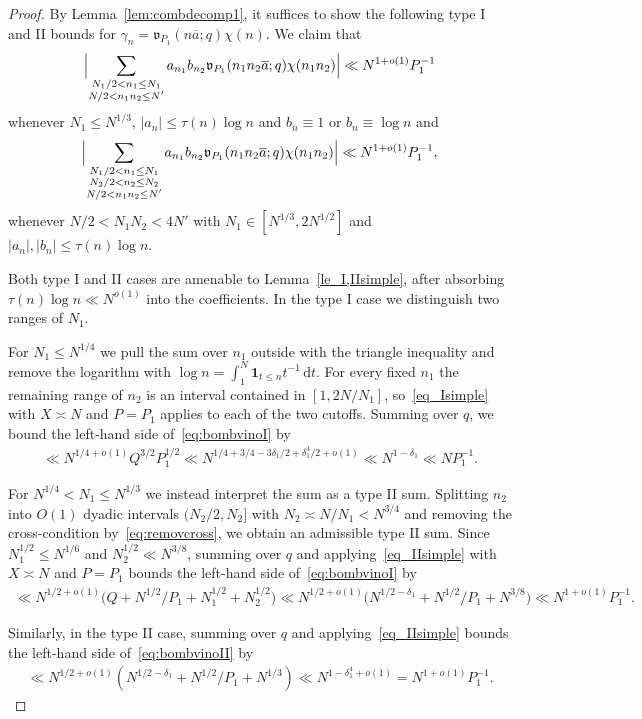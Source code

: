 \documentclass[12pt]{amsart}
\theoremstyle{definition}
\theoremstyle{remark}
\numberwithin{equation}{section}
\newcommand{\1}{\mathbf{1}}
\renewcommand\d{\,\mathrm{d}}
\begin{document}
\begin{proof}

 By Lemma~\ref{lem:combdecomp1}, it suffices to show the following type I and II bounds for $\gamma_n=\mathfrak{v}_{P_1}(n\overline{a};q)\chi(n)$. We claim that
 \begin{align}\label{eq:bombvinoI}
    \Bigl|\sum_{\substack{N_1/2 < n_1 \leq N_1\\ N/2 < n_1 n_2\leq N'}} a_{n_1} b_{n_2} \mathfrak{v}_{P_1}(n_1n_2\overline{a};q)\chi(n_1 n_2)\Bigr|\ll N^{1+o(1)} P_1^{-1}
\end{align}
 whenever $N_1\leq N^{1/3}$, $|a_n|\leq \tau(n)\log n$ and $b_n\equiv 1$ or $b_n\equiv \log n$ and
 \begin{align}\label{eq:bombvinoII}
    \Bigl|\sum_{\substack{N_1/2 < n_1 \leq N_1\\ N_2/2 <  n_2 \leq N_2\\ N/2<n_1n_2\le N'}} a_{n_1} b_{n_2}  \mathfrak{v}_{P_1}(n_1n_2\overline{a};q)\chi(n_1 n_2)\Bigr|\ll N^{1+o(1)} P_1^{-1},
\end{align}
whenever $N/2<N_1 N_2<4N'$ with $N_1\in [N^{1/3},2N^{1/2}]$ and $|a_n|,|b_n|\leq \tau(n)\log n$.


Both type I and II cases are amenable to Lemma~\ref{le_I,IIsimple}, after absorbing $\tau(n)\log n\ll N^{o(1)}$ into the coefficients. In the type I case we distinguish two ranges of $N_1$.

For $N_1\leq N^{1/4}$ we pull the sum over $n_1$ outside with the triangle inequality and remove the logarithm with $\log n=\int_{1}^{N}\1_{t\leq n}t^{-1}\d t$. For every fixed $n_1$ the remaining range of $n_2$ is an interval contained in $[1,2N/N_1]$, so~\eqref{eq_Isimple} with $X\asymp N$ and $P=P_1$ applies to each of the two cutoffs. Summing over $q$, we bound the left-hand side of~\eqref{eq:bombvinoI} by
	\begin{align*}
	  \ll N^{1/4+o(1)}Q^{3/2}P_1^{1/2}\ll N^{1/4+3/4-3\delta_1/2+\delta_1^4/2+o(1)}\ll N^{1-\delta_1}\ll NP_1^{-1}.
	\end{align*}
	
For $N^{1/4}<N_1\leq N^{1/3}$ we instead interpret the sum as a type II sum. Splitting $n_2$ into $O(1)$ dyadic intervals $(N_2/2,N_2]$ with $N_2\asymp N/N_1<N^{3/4}$ and removing the cross-condition by~\eqref{eq:removcross}, we obtain an admissible type II sum. Since $N_1^{1/2}\leq N^{1/6}$ and $N_2^{1/2}\ll N^{3/8}$, summing over $q$ and applying~\eqref{eq_IIsimple} with $X\asymp N$ and $P=P_1$ bounds the left-hand side of~\eqref{eq:bombvinoI} by
	\begin{align*}
	  \ll N^{1/2+o(1)}\bigl(Q+N^{1/2}/P_1+N_1^{1/2}+N_2^{1/2}\bigr)\ll N^{1/2+o(1)}\bigl(N^{1/2-\delta_1}+N^{1/2}/P_1+N^{3/8}\bigr)\ll N^{1+o(1)}P_1^{-1}.
	\end{align*}

 Similarly, in the type II case, summing over $q$ and applying~\eqref{eq_IIsimple} bounds the left-hand side of~\eqref{eq:bombvinoII} by
 \begin{align*}
    \ll N^{1/2+o(1)}(N^{1/2-\delta_1}+N^{1/2}/P_1+N^{1/3})\ll N^{1-\delta_1^4+o(1)}=N^{1+o(1)}P_1^{-1}.
 \end{align*}
\end{proof}
\end{document}
